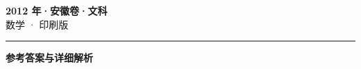 \documentclass[zihao=5, a4paper]{ctexart}
\begin{document}
\begin{center}
  {\Large\bfseries 2012 年·安徽卷·文科}\\[4pt]
  {\large 数学 · 印刷版}
\end{center}
\medskip
{}

\par\bigskip\hrule\bigskip
{}
\Needspace{0.55\textheight}
\begin{center}{\large\bfseries 参考答案与详细解析}\end{center}
\smallskip

\end{document}
